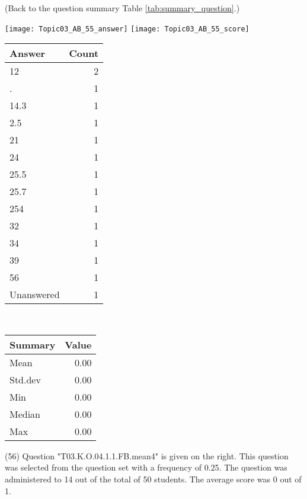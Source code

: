 \documentclass[12pt,english,nohyper]{tufte-handout}\usepackage[]{graphicx}\usepackage[]{color}
\begin{document}
 (Back to the question summary Table \ref{tab:summary_question}.)

\begin{center} \texttt{[image: Topic03\_AB\_55\_answer]} \texttt{[image: Topic03\_AB\_55\_score]} \end{center} 

\begin{center}%
\begin{tabular}{lr}
  \hline
Answer & Count \\ 
  \hline
12 &   2 \\ 
  . &   1 \\ 
  14.3 &   1 \\ 
  2.5 &   1 \\ 
  21 &   1 \\ 
  24 &   1 \\ 
  25.5 &   1 \\ 
  25.7 &   1 \\ 
  254 &   1 \\ 
  32 &   1 \\ 
  34 &   1 \\ 
  39 &   1 \\ 
  56 &   1 \\ 
  Unanswered &   1 \\ 
   \hline
\end{tabular}
~~~~~~~~%
\begin{tabular}{lr}
  \hline
Summary & Value \\ 
  \hline
Mean & 0.00 \\ 
  Std.dev & 0.00 \\ 
  Min & 0.00 \\ 
  Median & 0.00 \\ 
  Max & 0.00 \\ 
   \hline
\end{tabular}
\end{center}\newpage{} (56) Question "T03.K.O.04.1.1.FB.mean4" is given on the right. This question was selected from the question set with a frequency of 0.25. The question was administered to 14 out of the total of 50 students. The average score was 0 out of 1.
\end{document}
